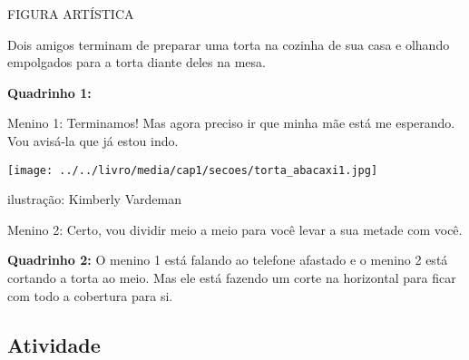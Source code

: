 \documentclass[a4paper,12pt,twoside]{book}
\begin{document}
\begin{refletindo*}[breakable]{}{}
  \begin{imagem*}[breakable]{}{}     FIGURA ARTÍSTICA    
    
    Dois amigos terminam de preparar uma torta na cozinha de sua casa e olhando empolgados para a torta diante deles na mesa.    
    
    {\bf Quadrinho 1:}         
    
    Menino 1:  Terminamos! Mas agora preciso ir que minha mãe está me esperando. Vou avisá-la que já estou indo.    
    
        \texttt{[image: ../../livro/media/cap1/secoes/torta\_abacaxi1.jpg]}    
    
    ilustração: Kimberly Vardeman    
    
    Menino 2: Certo, vou dividir meio a meio para você levar a sua metade com você.    
    
    {\bf Quadrinho 2:}    
    O menino 1 está falando ao telefone afastado e o menino 2 está cortando a torta ao meio. Mas ele está fazendo um corte na horizontal para ficar com todo a cobertura para si.    
  \end{imagem*}  
\end{refletindo*}




\subsection{Atividade}
\end{document}
